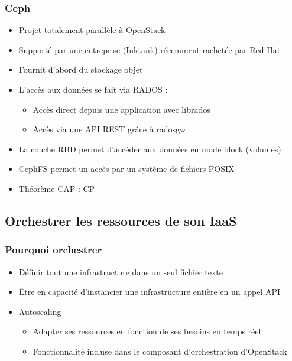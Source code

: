   \begin{frame}
  \frametitle{Ceph}
    \begin{itemize}
      \item Projet totalement parallèle à OpenStack
      \item Supporté par une entreprise (Inktank) récemment rachetée par Red Hat
      \item Fournit d'abord du stockage objet
      \item L'accès aux données se fait via RADOS :
      \begin{itemize}
        \item Accès direct depuis une application avec librados
        \item Accès via une API REST grâce à radosgw
      \end{itemize}
      \item La couche RBD permet d'accéder aux données en mode block (volumes)
      \item CephFS permet un accès par un système de fichiers POSIX
      \item Théorème CAP : CP
    \end{itemize}
  \end{frame}

  \subsection[Orchestration]{Orchestrer les ressources de son IaaS}

  \begin{frame}
    \frametitle{Pourquoi orchestrer}
    \begin{itemize}
      \item Définir tout une infrastructure dans un seul fichier texte
      \item Être en capacité d'instancier une infrastructure entière en un appel API
      \item Autoscaling
      \begin{itemize}
        \item Adapter ses ressources en fonction de ses besoins en temps réel
        \item Fonctionnalité incluse dans le composant d'orchestration d'OpenStack
      \end{itemize}
    \end{itemize}
  \end{frame}
  
